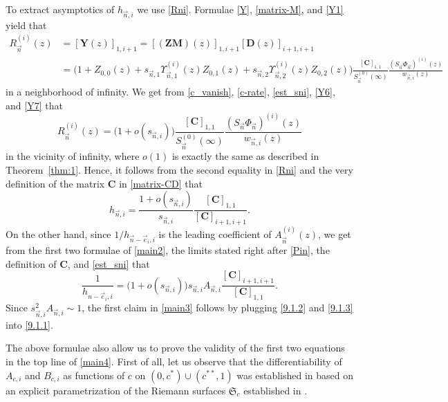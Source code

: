 \documentclass[pdftex]{sigma}
\numberwithin{equation}{section}
\newcommand{\n}{{\vec n}}
\newcommand{\RS}{\boldsymbol{\mathfrak{S}}}
\begin{document}
To extract asymptotics of $ h_{\n,i} $ we use \eqref{Rni}. Formulae \eqref{Y}, \eqref{matrix-M}, and \eqref{Y1} yield that
\begin{align*}
R_\n^{(i)}(z) &= [\boldsymbol Y(z)]_{1,i+1} =[(\boldsymbol{ZM})(z)]_{1,i+1}[\boldsymbol D(z)]_{i+1,i+1} \\
& = \bigl( 1+ Z_{0,0}(z) + s_{\n,1}\Upsilon_{\n,1}^{(i)}(z)Z_{0,1}(z) + s_{\n,2}\Upsilon_{\n,2}^{(i)}(z)Z_{0,2}(z) \bigr) \frac{ [\boldsymbol C]_{1,1}}{S_\n^{(0)}(\infty)} \frac{(S_\n\Phi_\n)^{(i)}(z)}{w_{\n,i}(z) }
\end{align*}
in a neighborhood of infinity. We get from \eqref{c_vanish}, \eqref{c-rate}, \eqref{est_sni}, \eqref{Y6}, and \eqref{Y7} that
\[
R_\n^{(i)}(z) = \bigl( 1 + o(s_{\n,i}) \bigr) \frac{ [\boldsymbol C]_{1,1}}{S_\n^{(0)}(\infty)} \frac{(S_\n\Phi_\n)^{(i)}(z)}{w_{\n,i}(z) }
\]
in the vicinity of infinity, where $ o(1) $ is exactly the same as described in Theorem~\ref{thm:1}. Hence, it follows from the second equality in \eqref{Rni} and the very definition of the matrix $ \boldsymbol C $ in \eqref{matrix-CD} that
\begin{equation}
\label{9.1.2}
h_{\n,i} = \frac{1 + o(s_{\n,i})}{s_{\n,i}} \frac{[\boldsymbol C]_{1,1}}{[\boldsymbol C]_{i+1,i+1}}.
\end{equation}
On the other hand, since $ 1/h_{\n-\vec e_i,i} $ is the leading coefficient of $ A_\n^{(i)}(z) $, we get from the first two formulae of \eqref{main2}, the limits stated right after \eqref{Pin}, the definition of $ \boldsymbol C $, and \eqref{est_sni} that
\begin{equation}
\label{9.1.3}
\frac1{h_{n-\vec e_i,i}} = \bigl( 1 + o(s_{\n,i}) \bigr) s_{\n,i}A_{\n,i} \frac{[\boldsymbol C]_{i+1,i+1}}{[\boldsymbol C]_{1,1}}.
\end{equation}
Since $ s_{\n,i}^2A_{\n,i} \sim 1$, the first claim in \eqref{main3} follows by plugging \eqref{9.1.2} and \eqref{9.1.3} into \eqref{9.1.1}.

The above formulae also allow us to prove the validity of the first two equations in the top line of \eqref{main4}. First of all, let us observe that the differentiability of $ A_{c,i} $ and $ B_{c,i} $ as functions of $ c $ on $ (0,c^*) \cup (c^{**},1) $ was established in \cite[Section~4]{ApKoz20} based on an explicit parametrization of the Riemann surfaces $ \RS_c $ established in \cite{ApKalLysTul09,LysTul17,LysTul18}.
\end{document}
